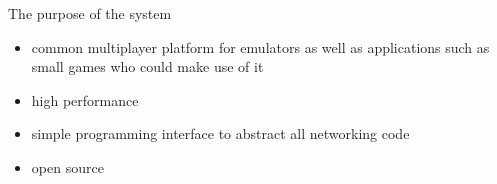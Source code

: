 \documentclass{article}
\begin{document}
The purpose of the system
\begin{itemize}
  \item common multiplayer platform for emulators as well as applications such as small games who could make use of it
  \item high performance
  \item simple programming interface to abstract all networking code
  \item open source
\end{itemize}



\clearpage



\end{document}

